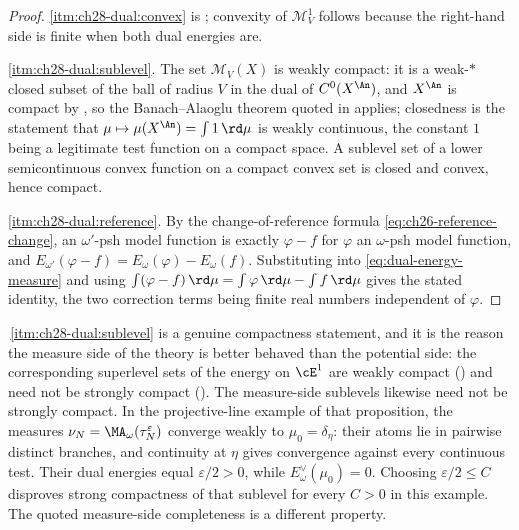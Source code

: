 \begin{proof}
\cref{itm:ch28-dual:convex} is ; convexity
of $\mathcal M^1_V$ follows because the right-hand side is finite when
both dual energies are.

\cref{itm:ch28-dual:sublevel}.  The set $\mathcal M_V(X)$ is weakly compact:
it is a weak-$*$ closed subset of the ball of radius $V$ in the dual of
$C^0(X^{\An})$, and $X^{\An}$ is compact by
, so the Banach--Alaoglu theorem quoted
in  applies; closedness is the statement that
$\mu\mapsto\mu(X^{\An})=\int 1\,\rd\mu$ is weakly continuous, the constant
$1$ being a legitimate test function on a compact space.  A sublevel set of
a lower semicontinuous convex function on a compact convex set is closed and
convex, hence compact.

\cref{itm:ch28-dual:reference}.  By the change-of-reference formula
\eqref{eq:ch26-reference-change}, an $\omega'$-psh model function is
exactly $\varphi-f$ for $\varphi$ an $\omega$-psh model function, and
$E_{\omega'}(\varphi-f)=E_\omega(\varphi)-E_\omega(f)$.  Substituting into
\eqref{eq:dual-energy-measure} and using
$\int(\varphi-f)\,\rd\mu=\int\varphi\,\rd\mu-\int f\,\rd\mu$ gives the
stated identity, the two correction terms being finite real numbers
independent of $\varphi$.
\end{proof}

\begin{remark}
\label{rem:ch28-weak-not-strong}
\,\cref{itm:ch28-dual:sublevel} is a genuine
compactness statement, and it is the reason the measure side of the theory
is better behaved than the potential side: the corresponding superlevel sets
of the energy on $\cE^1$ are weakly compact
() and need not be strongly compact
().  The measure-side sublevels
likewise need not be strongly compact.  In the projective-line example of
that proposition, the measures
$\nu_N=\MA_\omega(\tau_N^\varepsilon)$ converge weakly to
$\mu_0=\delta_\eta$: their atoms lie in pairwise distinct branches,
and continuity at $\eta$ gives convergence against every continuous test.
Their dual energies equal $\varepsilon/2>0$, while
$E_\omega^\vee(\mu_0)=0$.  Choosing $\varepsilon/2\leq C$ disproves
strong compactness of that sublevel for every $C>0$ in this example.
The quoted measure-side completeness is a different property.
\end{remark}

